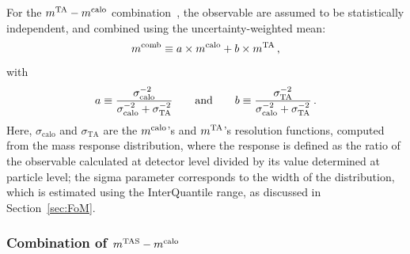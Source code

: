 For the $m^\textrm{TA}-m^\textrm{calo}$ combination~\cite{art35}, the observable are assumed to be statistically  independent, and combined using the uncertainty-weighted mean:
\begin{equation}
m^\textrm{comb}\equiv a\times m^\textrm{calo} + b \times m^\textrm{TA}\,,
\end{equation}
with 
\begin{equation}
a\equiv\frac{\sigma_\textrm{calo}^{-2}}{\sigma_\textrm{calo}^{-2}+\sigma_\textrm{TA}^{-2}} \qquad{\rm and}\qquad b\equiv\frac{\sigma_\textrm{TA}^{-2}}{\sigma_\textrm{calo}^{-2}+\sigma_\textrm{TA}^{-2}}\,.
\label{eq:mtacomb}
\end{equation}
Here, $\sigma_\textrm{calo}$ and $\sigma_\textrm{TA}$ are the $m^\textrm{calo}$'s and $m^\textrm{TA}$'s resolution functions, computed from the mass response distribution, where the response is defined as the ratio of the observable calculated at detector level divided by its value determined at particle level; the sigma parameter corresponds to the width of the distribution, which is estimated using the InterQuantile range, as discussed in Section~\ref{sec:FoM}.

\subsubsection{Combination of $m^\textrm{TAS}-m^\textrm{calo}$ }

